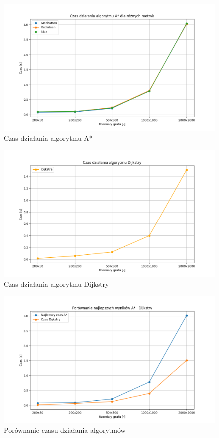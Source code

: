 \documentclass[12pt,twoside]{article}
\begin{document}
\begin{figure}[ht]%
 \centering%
 \includegraphics[width=12cm]{figures/static_algo/charts/nowalls/astar_heuristics.png}%
 \caption{Czas działania algorytmu A*}%
 \label{Fig:astar_heuristics}%
\end{figure}

\begin{figure}[ht]%
 \centering%
 \includegraphics[width=12cm]{figures/static_algo/charts/nowalls/dijkstra.png}%
 \caption{Czas działania algorytmu Dijkstry}%
 \label{Fig:dijkstra}%
\end{figure}

\begin{figure}[ht]%
 \centering%
 \includegraphics[width=12cm]{figures/static_algo/charts/nowalls/astar_vs_dijkstra.png}%
 \caption{Porównanie czasu działania algorytmów}%
 \label{Fig:astar_vs_dijkstra}%
\end{figure}
\end{document}
